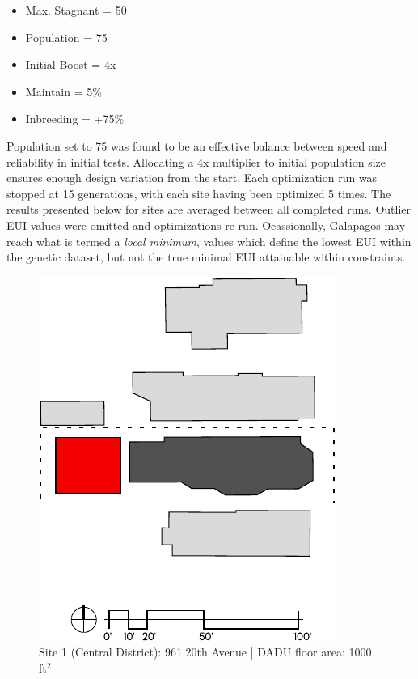 \documentclass[sagev,times,Review,doublespace]{sagej}
\begin{document}
\begin{itemize}
	\item Max. Stagnant = 50
	\item Population = 75
	\item Initial Boost = 4x
	\item Maintain = 5\%
	\item Inbreeding = +75\%
\label{galapagos-settings}
\end{itemize}

Population set to 75 was found to be an effective balance between speed and reliability in initial tests. Allocating a 4x multiplier to initial population size ensures enough design variation from the start. Each optimization run was stopped at 15 generations, with each site having been optimized 5 times. The results presented below for sites are averaged between all completed runs. Outlier EUI values were omitted and optimizations re-run. Ocassionally, Galapagos may reach what is termed a \textit{local minimum}, values which define the lowest EUI within the genetic dataset, but not the true minimal EUI attainable within constraints.

\begin{figure}[h!]
\centering
\includegraphics{site1.pdf}
\caption{Site 1 (Central District): 961 20th Avenue | DADU floor area: 1000 ft$^2$}
\label{site1-plan}
\end{figure}
\end{document}
